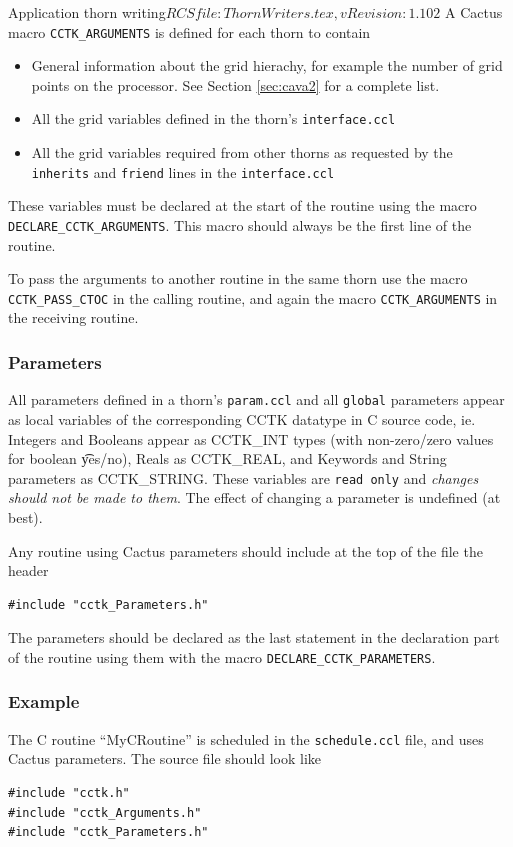 \begin{cactuspart}{2}{Application thorn writing}{$RCSfile: ThornWriters.tex,v $}{$Revision: 1.102 $}
A Cactus macro {\tt CCTK\_ARGUMENTS} is defined for each thorn
to contain
\begin{itemize}
\item General information about the grid hierachy, for example the
number of grid points on the processor. See Section \ref{sec:cava2}
for a complete list.
\item All the grid variables defined in the thorn's {\tt interface.ccl}
\item All the grid variables required from other thorns as requested by
      the {\tt inherits} and {\tt friend} lines in the {\tt interface.ccl}
\end{itemize}
These variables must be declared at the start of the routine using
the macro {\tt DECLARE\_CCTK\_ARGUMENTS}. This macro should always be the
first line of the routine.

To pass the arguments to another routine in the same thorn use the macro
{\tt CCTK\_PASS\_CTOC} in the calling routine, and again the macro
{\tt CCTK\_ARGUMENTS} in the receiving routine.


\subsubsection{Parameters}

All parameters defined in a thorn's {\tt param.ccl} and all {\tt global}
parameters appear as local variables of the corresponding CCTK datatype
in C source code, ie. Integers and Booleans appear as CCTK\_INT types (with
non-zero/zero values for boolean {\t yes/no)}, Reals as
CCTK\_REAL, and Keywords and String parameters as CCTK\_STRING.
These variables are {\tt read only} and {\em changes should not be made to
them}.  The effect of changing a parameter is undefined (at best).

Any routine using Cactus parameters should include at
the top of the file the header
\begin{verbatim}
#include "cctk_Parameters.h"
\end{verbatim}

The parameters should be declared as the last statement in the declaration part
of the routine using them with the macro {\tt DECLARE\_CCTK\_PARAMETERS}.

\subsubsection{Example}

The C routine ``MyCRoutine'' is scheduled in the {\tt schedule.ccl} file,
and uses Cactus parameters. The source file should look like
\begin{verbatim}
#include "cctk.h"
#include "cctk_Arguments.h"
#include "cctk_Parameters.h"


\end{verbatim}
\end{cactuspart}
